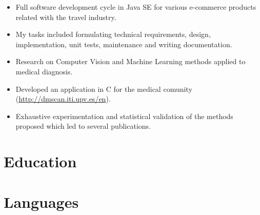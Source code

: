 \documentclass[11pt,a4paper,sans]{moderncv}
\begin{document}
{ \begin{itemize}
  \item Full software development cycle in Java SE for various e-commerce products related with the travel industry.
  \item My tasks included formulating technical requirements, design, implementation, unit tests, maintenance and writing documentation.
  \end{itemize}
}


{         \begin{itemize}
          \item Research on Computer Vision and Machine Learning methods applied to medical diagnosis.
          \item Developed an application in C for the medical comunity (\url{http://dmscan.iti.upv.es/en}).
          \item Exhaustive experimentation and statistical validation of the methods proposed which led to several publications.
          \end{itemize} }

\section{Education}

\section{Languages}
\begin{multicols}{3}
\end{multicols}

\renewcommand{\listitemsymbol}{-~}            %
\end{document}
